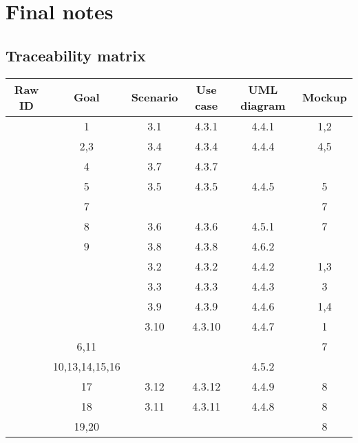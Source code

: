 \pagebreak
\section{Final notes}

\subsection{Traceability matrix}


\newcommand{\Row}[5]{
	\stepcounter{RowID}
	\arabic{RowID} & #1 & #2 & #3 & #4 & #5 \\

}

\begin{center}
	\vspace{0.2cm}
	\begin{tabular}{|c c c c c c|}
			\hline
			\textbf{Raw ID}	& \textbf{Goal}	& \textbf{Scenario}	& \textbf{Use case}	& \textbf{UML diagram} & \textbf{Mockup}	\\
			\hline
			\Row{1}{3.1}{4.3.1}{4.4.1}{1,2}
			\hline
			\Row{2,3}{3.4}{4.3.4}{4.4.4}{4,5}
			\hline
			\Row{4}{3.7}{4.3.7}{}{}
			\hline
			\Row{5}{3.5}{4.3.5}{4.4.5}{5}
			\hline
			\Row{7}{}{}{}{7}
			\hline
			\Row{8}{3.6}{4.3.6}{4.5.1}{7}
			\hline
			\Row{9}{3.8}{4.3.8}{4.6.2}{}
			\hline
			\Row{}{3.2}{4.3.2}{4.4.2}{1,3}
			\hline
			\Row{}{3.3}{4.3.3}{4.4.3}{3}
			\hline
			\Row{}{3.9}{4.3.9}{4.4.6}{1,4}
			\hline
			\Row{}{3.10}{4.3.10}{4.4.7}{1}
			\hline
			\Row{6,11}{}{}{}{7}
			\hline
			\Row{10,13,14,15,16}{}{}{4.5.2}{}
			\hline
			\Row{17}{3.12}{4.3.12}{4.4.9}{8}
			\hline
			\Row{18}{3.11}{4.3.11}{4.4.8}{8}
			\hline
			\Row{19,20}{}{}{}{8}
	
			\hline
	\end{tabular}
\end{center}
